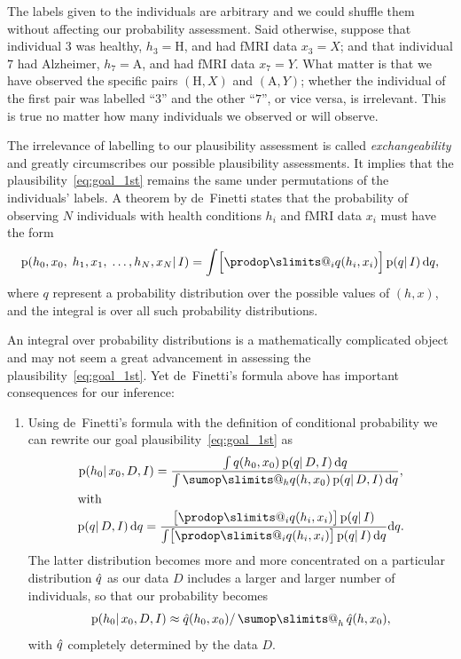 \documentclass[\ifafour a4paper,12pt,\else a5paper,10pt,\fi%
onecolumn,oneside,article,%
british%
]{memoir}
\makeatletter
\theoremstyle{remark}
\theoremstyle{innote}
\def\sum{\DOTSI\sumop\slimits@}
\def\prod{\DOTSI\prodop\slimits@}
\let\parentext=\parentexttrack%
\newcommand*{\di}{\mathrm{d}}%
\newcommand*{\pf}{\mathrm{p}}%
\renewcommand*{\|}{\mathpunct{|}}
\newcommand*{\tsum}{\mathop{\textstyle\sum}\nolimits}
\newcommand*{\yH}{h}
\newcommand*{\yD}{D}
\newcommand*{\yx}{x}
\newcommand*{\ya}{\mathrm{A}}
\newcommand*{\yh}{\mathrm{H}}
\newcommand*{\yp}{q}
\newcommand*{\ypc}{\Hat{\yp}}
\newcommand*{\yI}{I}
\theoremstyle{plain}
\makeatother
\begin{document}
The labels given to the individuals are arbitrary and we could shuffle them
without affecting our probability assessment. Said otherwise, suppose that
individual $3$ was healthy, $\yH_3=\yh$, and had fMRI data $\yx_3=X$; and
that individual $7$ had Alzheimer, $\yH_7=\ya$, and had fMRI data
$\yx_7=Y$. What matter is that we have observed the specific pairs
$(\yh,X)$ and $(\ya,Y)$; whether the individual of the first pair was
labelled \enquote{$3$} and the other \enquote{$7$}, or vice versa, is
irrelevant. This is true no matter how many individuals we observed or will
observe.

The irrelevance of labelling to our plausibility assessment is called
\emph{exchangeability} and greatly circumscribes our possible plausibility
assessments. It implies that the plausibility~\eqref{eq:goal_1st} remains
the same under permutations of the individuals' labels. A theorem by
de~Finetti \parentext{\citeyear{definetti1930,definetti1937};
  \cite{hewittetal1955}} states that the probability of observing $N$
individuals with health conditions $\yH_i$ and fMRI data $\yx_i$ must have
the form
\begin{equation}
  \label{eq:definetti_exchangeability}
  \pf(\yH_0, \yx_0,\; \yH_1,\yx_1,\; \dotsc, \yH_N, \yx_N\| \yI)
  =
  \int \Bigl[ \prod_i \yp(\yH_i,\yx_i) \Bigr]\,
  \pf(\yp \|\yI) \,\di\yp,
\end{equation}
where $\yp$ represent a probability distribution over the possible values
of $(\yH,\yx)$, and the integral is over all such probability
distributions.

An integral over probability distributions is a mathematically complicated
object and may not seem a great advancement in assessing the
plausibility~\eqref{eq:goal_1st}. Yet de~Finetti's formula above has
important consequences for our inference:
\begin{enumerate}[wide]
\item Using de~Finetti's formula with the definition of conditional
  probability we can rewrite our goal plausibility~\eqref{eq:goal_1st} as
  \begin{gather}
    \label{eq:goal_1st_exchangeability}
    \pf(\yH_0 \| \yx_0, \yD, \yI) =
    \frac{   
 \int \yp(\yH_0,\yx_0)\, \pf(\yp \|\yD,\yI) \,\di\yp
    }{
 \int \sum_{\yH}\yp(\yH,\yx_0)\, \pf(\yp \|\yD,\yI) \,\di\yp
},
\\\shortintertext{with}
\pf(\yp \|\yD,\yI) \,\di\yp =
   \frac{   
\bigl[ \prod_i \yp(\yH_i,\yx_i) \bigr]\, \pf(\yp \|\yI)
}{
\int  \bigl[ \prod_i \yp(\yH_i,\yx_i) \bigr]\, \pf(\yp \|\yI) \,\di\yp
}\di\yp.
\end{gather}
The latter distribution becomes more and more concentrated on a particular
distribution $\ypc$ as our data $\yD$ includes a larger and larger number
of individuals, so that our probability becomes
\begin{equation}
  \label{eq:goal_1st_limit}
  \pf(\yH_0 \| \yx_0, \yD, \yI) \approx
  \ypc(\yH_0,\yx_0) / \tsum_{\yH}\ypc(\yH,\yx_0),
\end{equation}
with $\ypc$ completely determined by the data $\yD$.
\end{enumerate}
\end{document}
